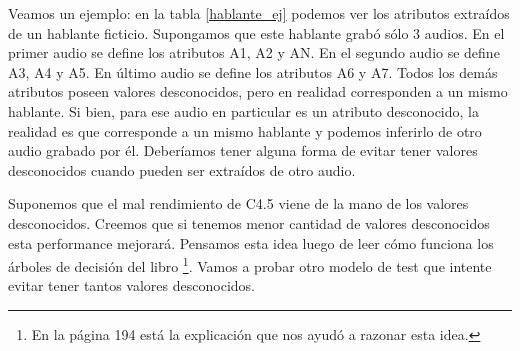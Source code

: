 Veamos un ejemplo: en la tabla \ref{hablante_ej} podemos ver los atributos extraídos de un hablante ficticio. Supongamos que este hablante grabó sólo 3 audios. En el primer audio se define los atributos A1, A2 y AN. En el segundo audio se define A3, A4 y A5. En último audio se define los atributos A6 y A7. Todos los demás atributos poseen valores desconocidos, pero en realidad corresponden a un mismo hablante. Si bien, para ese audio en particular es un atributo desconocido, la realidad es que corresponde a un mismo hablante y podemos inferirlo de otro audio grabado por él. Deberíamos tener alguna forma de evitar tener valores desconocidos cuando pueden ser extraídos de otro audio.

Suponemos que el mal rendimiento de C4.5 viene de la mano de los valores desconocidos. Creemos que si tenemos menor cantidad de valores desconocidos esta performance mejorará. Pensamos esta idea luego de leer cómo funciona los árboles de decisión del libro \cite{DataMining-PracticalMachineLearningTools} \footnote{En la página 194 está la explicación que nos ayudó a razonar esta idea.}. Vamos a probar otro modelo de test que intente evitar tener tantos valores desconocidos. 